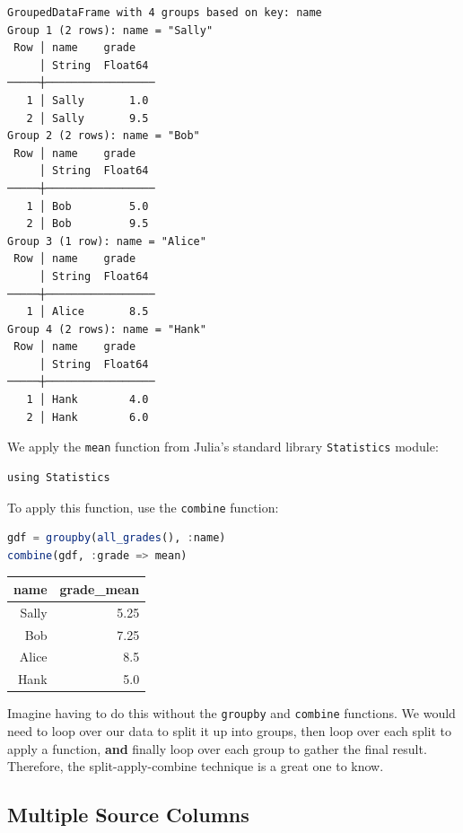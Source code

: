 \documentclass[
  notoc %
]{tufte-book}
\newcommand{\passthrough}[1]{#1}
\begin{document}
\begin{lstlisting}
GroupedDataFrame with 4 groups based on key: name
Group 1 (2 rows): name = "Sally"
 Row │ name    grade
     │ String  Float64
─────┼─────────────────
   1 │ Sally       1.0
   2 │ Sally       9.5
Group 2 (2 rows): name = "Bob"
 Row │ name    grade
     │ String  Float64
─────┼─────────────────
   1 │ Bob         5.0
   2 │ Bob         9.5
Group 3 (1 row): name = "Alice"
 Row │ name    grade
     │ String  Float64
─────┼─────────────────
   1 │ Alice       8.5
Group 4 (2 rows): name = "Hank"
 Row │ name    grade
     │ String  Float64
─────┼─────────────────
   1 │ Hank        4.0
   2 │ Hank        6.0
\end{lstlisting}

We apply the \passthrough{\lstinline!mean!} function from Julia's
standard library \passthrough{\lstinline!Statistics!} module:

\begin{lstlisting}
using Statistics
\end{lstlisting}

To apply this function, use the \passthrough{\lstinline!combine!}
function:

\begin{lstlisting}[language=Julia]
gdf = groupby(all_grades(), :name)
combine(gdf, :grade => mean)
\end{lstlisting}

\begin{longtable}[]{@{}rr@{}}
\toprule
name & grade\_mean \\
\midrule
\endhead
Sally & 5.25 \\
Bob & 7.25 \\
Alice & 8.5 \\
Hank & 5.0 \\
\bottomrule
\end{longtable}

Imagine having to do this without the \passthrough{\lstinline!groupby!}
and \passthrough{\lstinline!combine!} functions. We would need to loop
over our data to split it up into groups, then loop over each split to
apply a function, \textbf{and} finally loop over each group to gather
the final result. Therefore, the split-apply-combine technique is a
great one to know.

\hypertarget{sec:groupby_combine_multiple_source}{%
\subsection{Multiple Source
Columns}\label{sec:groupby_combine_multiple_source}}
\end{document}
